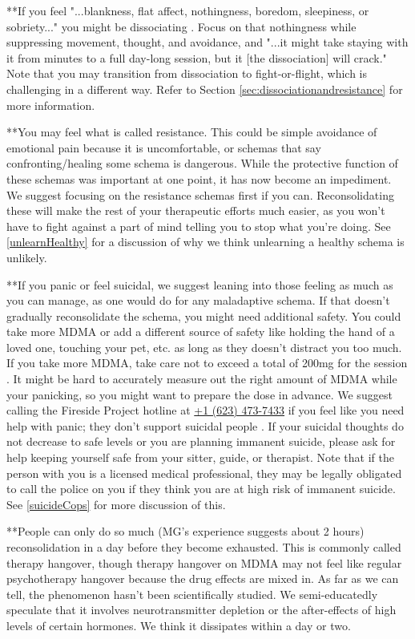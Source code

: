 \documentclass[12pt,letterpaper]{book}
\begin{document}
**If you feel "...blankness, flat affect, nothingness, boredom, sleepiness, or sobriety..." you might be dissociating \cite{razviPSIP}. Focus on that nothingness while suppressing movement, thought, and avoidance, and "...it might take staying with it from minutes to a full day-long session, but it [the dissociation] will crack." Note that you may transition from dissociation to fight-or-flight, which is challenging in a different way. Refer to Section \ref{sec:dissociationandresistance} for more information.

**You may feel what is called resistance. This could be simple avoidance of emotional pain because it is uncomfortable, or schemas that say confronting/healing some schema is dangerous. While the protective function of these schemas was important at one point, it has now become an impediment. We suggest focusing on the resistance schemas first if you can. Reconsolidating these will make the rest of your therapeutic efforts much easier, as you won't have to fight against a part of mind telling you to stop what you're doing. See \ref{unlearnHealthy} for a discussion of why we think unlearning a healthy schema is unlikely.

**If you panic or feel suicidal, we suggest leaning into those feeling as much as you can manage, as one would do for any maladaptive schema. If that doesn't gradually reconsolidate the schema, you might need additional safety. You could take more MDMA or add a different source of safety like holding the hand of a loved one, touching your pet, etc. as long as they doesn't distract you too much. If you take more MDMA, take care not to exceed a total of 200mg for the session \cite{liechtiInteractions}. It might be hard to accurately measure out the right amount of MDMA while your panicking, so you might want to prepare the dose in advance. We suggest calling the Fireside Project hotline at \href{tel:1-623-473-7433}{+1 (623) 473-7433} if you feel like you need help with panic; they don't support suicidal people \cite{firesideProject}. If your suicidal thoughts do not decrease to safe levels or you are planning immanent suicide, please ask for help keeping yourself safe from your sitter, guide, or therapist. Note that if the person with you is a licensed medical professional, they may be legally obligated to call the police on you if they think you are at high risk of immanent suicide. See \ref{suicideCops} for more discussion of this.

\label{def:hangover}
**People can only do so much (MG's experience suggests about 2 hours) reconsolidation in a day before they become exhausted. This is commonly called therapy hangover, though therapy hangover on MDMA may not feel like regular psychotherapy hangover because the drug effects are mixed in. As far as we can tell, the phenomenon hasn't been scientifically studied. We semi-educatedly speculate that it involves neurotransmitter depletion or the after-effects of high levels of certain hormones. We think it dissipates within a day or two.
\end{document}
